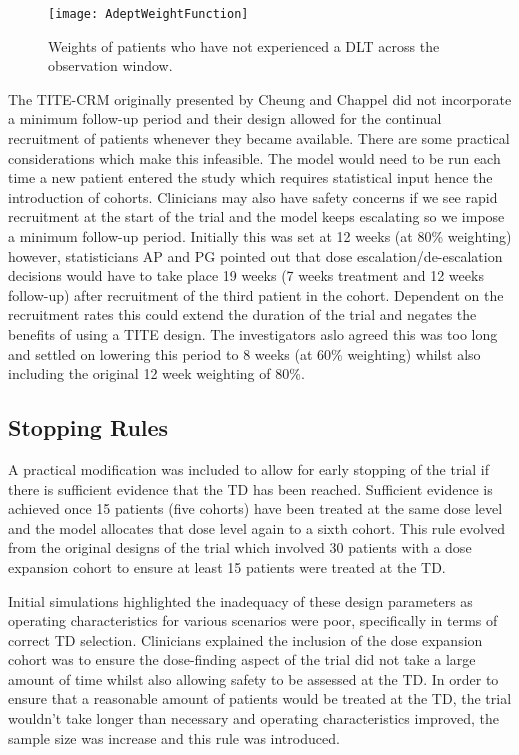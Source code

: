 \begin{figure}[h!]
	\centering
	\caption[Weight function across the follow-up period.]{Weights of patients who have not experienced a DLT across the observation window.}
	\label{fig_adept:weight_function}
	\texttt{[image: AdeptWeightFunction]}
\end{figure}


The TITE-CRM originally presented by Cheung and Chappel \cite{cheungSequentialDesignsPhase2000} did not incorporate a minimum follow-up period and their design allowed for the continual recruitment of patients whenever they became available. There are some practical considerations which make this infeasible. The model would need to be run each time a new patient entered the study which requires statistical input hence the introduction of cohorts. Clinicians may also have safety concerns if we see rapid recruitment at the start of the trial and the model keeps escalating so we impose a minimum follow-up period. Initially this was set at 12 weeks (at 80\% weighting) however, statisticians AP and PG  pointed out that dose escalation/de-escalation decisions would have to take place 19 weeks (7 weeks treatment and 12 weeks follow-up) after recruitment of the third patient in the cohort. Dependent on the recruitment rates this could extend the duration of the trial and negates the benefits of using a TITE design. The investigators aslo agreed this was too long and settled on lowering this period to 8 weeks (at 60\% weighting) whilst also including the original 12 week weighting of 80\%.


\subsection{Stopping Rules}
\label{section2.3.3}%

A practical modification was included to allow for early stopping of the trial if there is sufficient evidence that the TD has been reached. Sufficient evidence is achieved once 15 patients (five cohorts) have been treated at the same dose level and the model allocates that dose level again to a sixth cohort. This rule evolved from the original designs of the trial which involved 30 patients with a dose expansion cohort to ensure at least 15 patients were treated at the TD. 

Initial simulations highlighted the inadequacy of these design parameters as operating characteristics for various scenarios were poor, specifically in terms of correct TD selection. Clinicians explained the inclusion of the dose expansion cohort was to ensure the dose-finding aspect of the trial did not take a large amount of time whilst also allowing safety to be assessed at the TD. In order to ensure that a reasonable amount of patients would be treated at the TD, the trial wouldn't take longer than necessary and operating characteristics improved, the sample size was increase and this rule was introduced.

